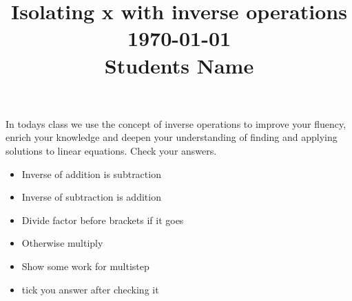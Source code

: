 \documentclass[12pt, a4paper, addpoints]{exam}
\title{\large Isolating x with inverse operations    \\ \dayofweekname{\day}{\month}{\year} \today \\\vspace{2mm} \quad  Students Name \underline{\hspace{8cm}}}
\date{}
\begin{document}
\maketitle


\vspace{-18mm}
\noindent 
In todays class we use the concept of inverse operations  to improve your fluency, enrich  your knowledge and deepen your understanding of finding and applying solutions to linear equations. Check your answers.


\begin{questions}



\begin{mdframed}[backgroundcolor=gray!10] %
\scriptsize
\setlength{\columnsep}{2pt}
\begin{multicols}{3}
\begin{itemize}
\item  Inverse of addition is subtraction
\item Inverse of  subtraction is addition
\item Divide factor before brackets if it goes
\item Otherwise multiply
\item Show some work for multistep
\item tick you answer after checking it
\end{itemize}
\end{multicols}
\end{mdframed}



\newpage






\end{questions}
\end{document}
